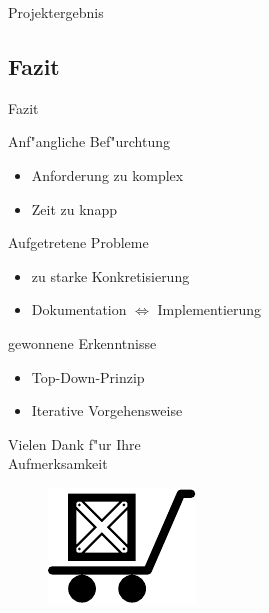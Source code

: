\begin{frame}{Projektergebnis}
 \begin{overlayarea}{\textwidth}{.33\textheight}
 \centering
 \end{overlayarea}

\end{frame}
\subsection{Fazit}
\begin{frame}[<+->]{Fazit}
\begin{block}{Anf"angliche Bef"urchtung}
\begin{itemize}
\item{Anforderung zu komplex}
\item{Zeit zu knapp}
\end{itemize}
\end{block}
\begin{block}{Aufgetretene Probleme}
\begin{itemize}
\item{zu starke Konkretisierung}
\item{Dokumentation $\Leftrightarrow$ Implementierung}
\end{itemize}
\end{block}
\begin{block}{gewonnene Erkenntnisse}
\begin{itemize}
\item{Top-Down-Prinzip}
\item{Iterative Vorgehensweise}
\end{itemize}
\end{block}
\end{frame}

\begin{frame}{}
\begin{center}
\huge{Vielen Dank f"ur Ihre\\Aufmerksamkeit}\\
\begin{figure}[b!]
\includegraphics{platform11}
\end{figure}
\end{center}
\end{frame}



